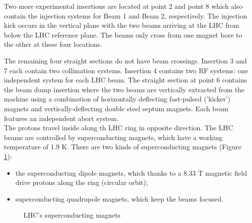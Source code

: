 \documentclass[a4paper, oneside]{book}
\begin{document}
					Two more experimental insertions are located at point 2 and point 8 which also contain the injection systems for Beam
					1 and Beam 2, respectively. The injection kick occurs in the vertical plane with the two beams arriving at the LHC from below the LHC reference plane. The beams only cross from one magnet bore to the other at
					these four locations.
					
					The remaining four straight sections do not have beam crossings. Insertion 3 and 7 each contain two collimation systems. Insertion 4 contains two RF systems: one independent system for each LHC
					beam. The straight section at point 6 contains the beam dump insertion where the two beams are vertically
					extracted from the machine using a combination of horizontally deflecting fast-pulsed ('kicker') magnets and
					vertically-deflecting double steel septum magnets. Each beam features an independent abort system. \cite{LHC design} \\
					The protons travel inside along th LHC ring in opposite direction. The LHC beams are controlled by superconducting magnets, which have a working temperature of 1.9 K. There are two kinds of superconducting magnets (Figure \ref{fig:magnets}):
					\begin{itemize}
						\item the superconducting dipole magnets, which thanks to a 8.33 T magnetic field drive protons along the ring (circular orbit);
						\item superconducting quadrupole magnets, which keep the beams focused.
					\end{itemize} 
					\begin{figure}
						\centering
						 \quad
						\caption{LHC's superconducting magnets}
						\label{fig:magnets}
					\end{figure}
\end{document}
